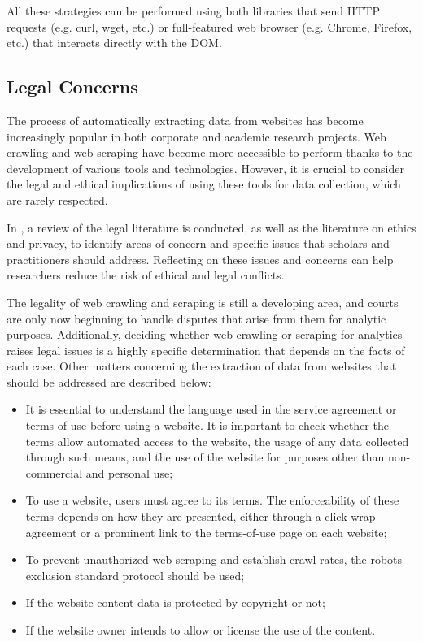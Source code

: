\documentclass[../thesis.tex]{subfiles}
\begin{document}
All these strategies can be performed using both libraries that send \acrshort{HTTP} requests (e.g. curl, wget, etc.) or full-featured web browser (e.g. Chrome, Firefox, etc.) that interacts directly with the \acrshort{DOM}.

\subsection{Legal Concerns}
The process of automatically extracting data from websites has become increasingly popular in both corporate and academic research projects. Web crawling and web scraping have become more accessible to perform thanks to the development of various tools and technologies. However, it is crucial to consider the legal and ethical implications of using these tools for data collection, which are rarely respected.

In  \cite{article:web_scraping_crawling_2021}, a review of the legal literature is conducted, as well as the literature on ethics and privacy, to identify areas of concern and specific issues that scholars and practitioners should address. Reflecting on these issues and concerns can help researchers reduce the risk of ethical and legal conflicts.

The legality of web crawling and scraping is still a developing area, and courts are only now beginning to handle disputes that arise from them for analytic purposes. Additionally, deciding whether web crawling or scraping for analytics raises legal issues is a highly specific determination that depends on the facts of each case. Other matters concerning the extraction of data from websites that should be addressed are described below:
\begin{itemize}
    \item It is essential to understand the language used in the service agreement or terms of use before using a website. It is important to check whether the terms allow automated access to the website, the usage of any data collected through such means, and the use of the website for purposes other than non-commercial and personal use;
    \item To use a website, users must agree to its terms. The enforceability of these terms depends on how they are presented, either through a click-wrap agreement or a prominent link to the terms-of-use page on each website;
    \item To prevent unauthorized web scraping and establish crawl rates, the robots exclusion standard protocol should be used;
    \item If the website content data is protected by copyright or not;
    \item If the website owner intends to allow or license the use of the content.
\end{itemize}
\end{document}
